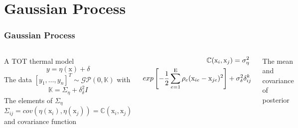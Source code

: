 \documentclass[10pt,hyperref={pdfpagelabels=false}]{beamer}
\begin{document}
\section{Gaussian Process}
\begin{frame}[fragile]
\frametitle{Gaussian Process}
\begin{columns}
A TOT thermal model
\begin{equation}\label{e7}
   y=\eta(\mathrm{x})+\delta 
\end{equation}
The data $\left [ y_1,\dots,y_n \right ]^T\sim \mathcal{GP}(0, \mathbb{K})$ with 
\begin{equation}\label{e8}
    \mathbb{K}=\Sigma_{\eta}+\delta_{\delta}^2I
\end{equation}
The elements of $\Sigma_{\eta}$ 
 \begin{equation*}\label{e4}
     \Sigma_{ij}=cov(\eta(\mathrm{x}_{i}), \eta(\mathrm{x}_{j}))=\mathbb{C}(\mathrm{x}_i,\mathrm{x}_j)
 \end{equation*}
  and covariance function 
  \begin{small}
 \begin{align*}\label{e6}
     \mathbb{C}(\mathrm{x}_i,\mathrm{x}_j)=\sigma_{\eta}^2\hspace{0.1cm}\\exp\left [ -\frac{1}{2}\sum_{e=1}^{\mathrm{E}}\rho _e(\mathrm{x}_{ie}-\mathrm{x}_{je})^2 \right ]+\sigma_{\delta}^2\delta_{ij}^k
 \end{align*}
  \end{small}
 The mean and covariance of posterior 



\end{columns}
\end{frame}
\end{document}

